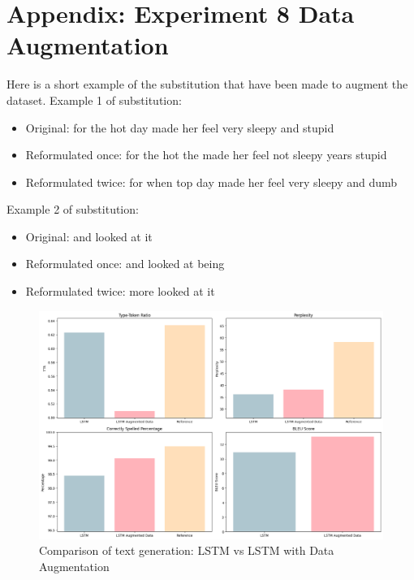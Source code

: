 \documentclass{article}
\begin{document}
\section*{Appendix: Experiment 8 Data Augmentation}

Here is a short example of the substitution that have been made to augment the dataset.
Example 1 of substitution:
\begin{itemize}
    \item Original: for the hot day made her feel very sleepy and stupid
    \item Reformulated once: for the hot the made her feel not sleepy years stupid
    \item Reformulated twice: for when top day made her feel very sleepy and dumb
\end{itemize}
Example 2 of substitution:
\begin{itemize}
    \item Original: and looked at it 
    \item Reformulated once: and looked at being 
    \item Reformulated twice: more looked at it 
\end{itemize}

\begin{figure}[H]
    \centering
    \includegraphics[width=0.8\linewidth]{figures/text_augmented.png}
    \caption{Comparison of text generation: LSTM vs LSTM with Data Augmentation}
    \label{fig:text_augmentation}
\end{figure}
\end{document}
